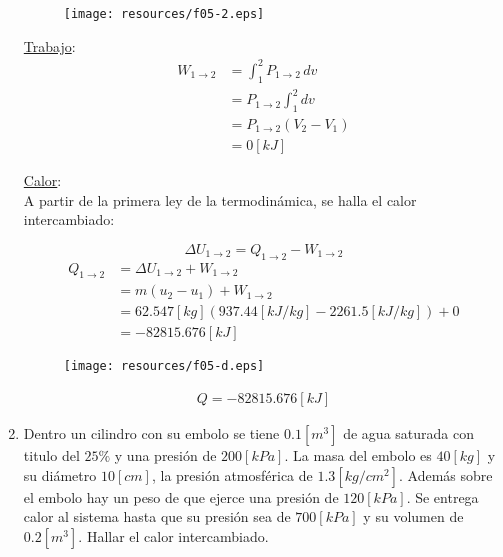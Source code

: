 \documentclass[letter,11pt]{article}
\begin{document}
\begin{enumerate}
\begin{figure}[H]
\centering
\texttt{[image: resources/f05-2.eps]}
\end{figure}

\underline{Trabajo}: \\
\begin{equation*}
    \begin{split}
    W_{1\rightarrow 2} &= \int_1^2 P_{1\rightarrow 2}\,dv \\
                       &= P_{1\rightarrow 2} \int_1^2 dv \\
                       &= P_{1\rightarrow 2} (V_2-V_1) \\
                       &= 0[kJ]
    \end{split}
\end{equation*}

\underline{Calor}: \\
A partir de la primera ley de la termodinámica, se halla el calor intercambiado:

\begin{equation*}
    \Delta U_{1\rightarrow 2} = Q_{1\rightarrow 2} - W_{1\rightarrow 2}
\end{equation*}
\begin{equation*}
    \begin{split}
        Q_{1\rightarrow 2} &= \Delta U_{1\rightarrow 2} + W_{1\rightarrow 2} \\
                           &= m(u_2 - u_1) + W_{1\rightarrow 2} \\
                           &= 62.547[kg](937.44[kJ/kg]-2261.5[kJ/kg])+0 \\
                           &= -82815.676[kJ]
    \end{split}
\end{equation*}

\begin{figure}[H]
\centering
\texttt{[image: resources/f05-d.eps]}
\end{figure}

\begin{equation*}
\boxed{
    \begin{array}{l}
        Q = -82815.676[kJ]
    \end{array}
}
\end{equation*}
\newpage

\item Dentro un cilindro con su embolo se tiene $0.1[m^3]$ de agua saturada con
titulo del $25\%$ y una presión de $200[kPa]$. La masa del embolo es $40[kg]$ y
su diámetro $10[cm]$, la presión atmosférica de $1.3[kg/cm^2]$. Además sobre el
embolo hay un peso de que ejerce una presión de $120[kPa]$. Se entrega calor al
sistema hasta que su presión sea de $700[kPa]$ y su volumen de $0.2[m^3]$.
Hallar el calor intercambiado.


\end{enumerate}
\end{document}
